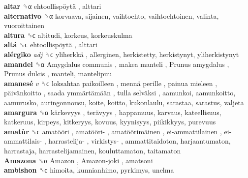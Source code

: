 \textbf{altar} ␝α   ehtoollispöytä , alttari  \\
\textbf{alternativo} ␝α  korvaava, sijainen, vaihtoehto, vaihtoehtoinen, valinta, vuoroittainen  \\
\textbf{altura} ␝ϲ  altitudi, korkeus, korkeuskulma  \\
\textbf{altá} ␝ϲ   ehtoollispöytä , alttari  \\
\textbf{alérgiko} \emph{adj}  ␝ϲ   yliherkkä , allerginen, herkistetty, herkistynyt, yliherkistynyt  \\
\textbf{amandel} ␝α   Amygdalus communis ,  makea manteli ,  Prunus amygdalus ,  Prunus dulcis , manteli, mantelipuu  \\
\textbf{amanesé} \emph{v}  ␝ϲ   loksahtaa paikoilleen ,  mennä perille ,  painua mieleen ,  päivänkoitto ,  saada ymmärtämään ,  tulla selväksi , aamunkoi, aamunkoitto, aamurusko, auringonnousu, koite, koitto, kukonlaulu, sarastaa, sarastus, valjeta  \\
\textbf{amargura} ␝α   kärkevyys ,  terävyys , happamuus, karvaus, kateellisuus, katkeruus, kirpeys, kitkeryys, kovuus, kyynisyys, piikikkyys, purevuus  \\
\textbf{amatùr} ␝ϲ   amatööri ,  amatööri- ,  amatöörimäinen ,  ei-ammattilainen ,  ei-ammattilais- ,  harrastelija- ,  virkistys- , ammattitaidoton, harjaantumaton, harrastaja, harrastelijamainen, kouluttamaton, taitamaton  \\
\textbf{Amazona} ␝α   Amazon ,  Amazon-joki , amatsoni  \\
\textbf{ambishon} ␝ϲ  himoita, kunnianhimo, pyrkimys, unelma  \\
